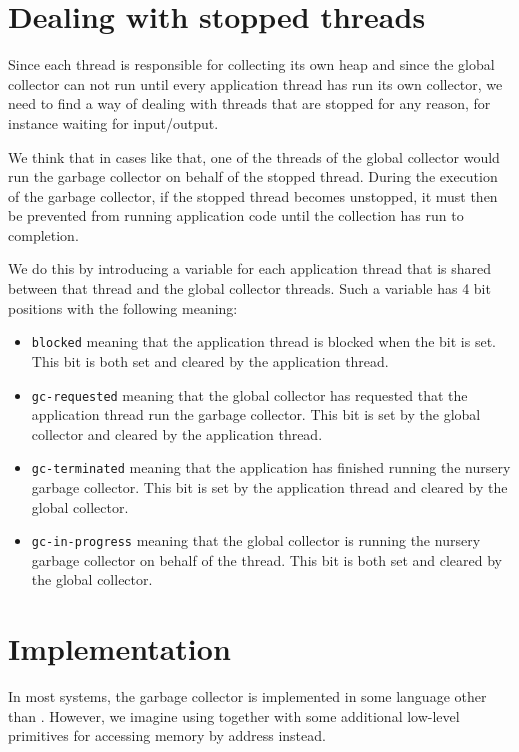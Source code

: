 \section{Dealing with stopped threads}

Since each thread is responsible for collecting its own heap and since
the global collector can not run until every application thread has
run its own collector, we need to find a way of dealing with threads
that are stopped for any reason, for instance waiting for
input/output.

We think that in cases like that, one of the threads of the global
collector would run the garbage collector on behalf of the stopped
thread.  During the execution of the garbage collector, if the stopped
thread becomes unstopped, it must then be prevented from running
application code until the collection has run to completion.

We do this by introducing a variable for each application thread that
is shared between that thread and the global collector threads.  Such
a variable has 4 bit positions with the following meaning:

\begin{itemize}
\item \texttt{blocked} meaning that the application thread is blocked
  when the bit is set.  This bit is both set and cleared by the
  application thread.
\item \texttt{gc-requested} meaning that the global collector has
  requested that the application thread run the garbage collector.
  This bit is set by the global collector and cleared by the
  application thread.
\item \texttt{gc-terminated} meaning that the application has finished
  running the nursery garbage collector.  This bit is set by the
  application thread and cleared by the global collector.
\item \texttt{gc-in-progress} meaning that the global collector is
  running the nursery garbage collector on behalf of the thread.  This
  bit is both set and cleared by the global collector.
\end{itemize}

\section{Implementation}

In most systems, the garbage collector is implemented in some language
other than \commonlisp{}.  However, we imagine using \commonlisp{}
together with some additional low-level primitives for accessing
memory by address instead.

